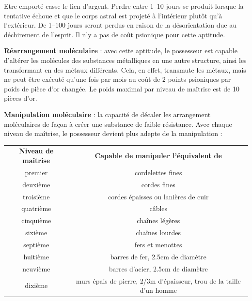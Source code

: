 {\bigskip

Etre emporté casse le lien d'argent. Perdre entre 1--10 jours se produit lorsque la tentative échoue et que le corps astral est projeté à l'intérieur plutôt qu'à l'extérieur. De 1--100 jours seront perdus en raison de la désorientation due au déchirement de l'esprit. Il n'y a pas de coût psionique pour cette aptitude.

\bigskip

\textbf{Réarrangement moléculaire} : avec cette aptitude, le possesseur est capable d'altérer les molécules des substances métalliques en une autre structure, ainsi les transformant en des métaux différents. Cela, en effet, transmute les métaux, mais ne peut être exécuté qu'une fois par mois au coût de 2 points psioniques par poids de pièce d'or changée. Le poids maximal par niveau de maîtrise est de 10 pièces d'or.

\bigskip

\textbf{Manipulation moléculaire} : la capacité de décaler les arrangement moléculaires de façon à créer une substance de faible résistance. Avec chaque niveau de maîtrise, le possesseur devient plus adepte de la manipulation :

\bigskip

{\parindent0.5cm\begin{tabular}{cc}
\textbf{Niveau de maîtrise} & \textbf{Capable de manipuler l'équivalent de} \\
premier    & cordelettes fines \\
deuxième   & cordes fines \\
troisième  & cordes épaisses ou lanières de cuir\\
quatrième  & câbles \\
cinquième  & chaînes légères \\
sixième    & chaînes lourdes \\
septième   & fers et menottes\\
huitième   & barres de fer, 2.5cm de diamètre\\
neuvième   & barres d'acier, 2.5cm de diamètre \\
dixième    & murs épais de pierre, 2/3m d'épaisseur, trou de la taille d'un homme \\
\end{tabular}}

\bigskip

}
